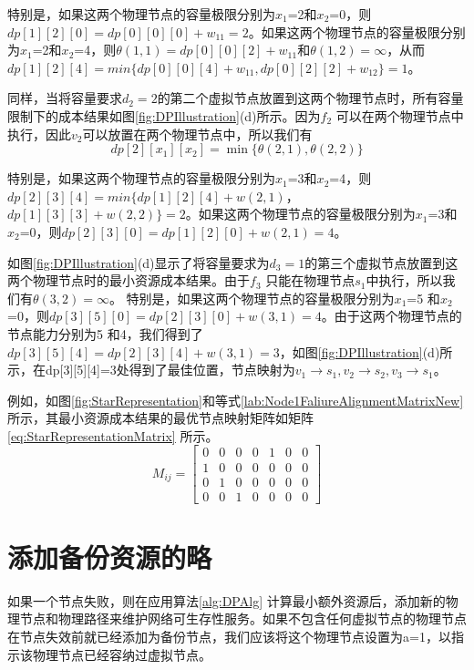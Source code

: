 特别是，如果这两个物理节点的容量极限分别为$x_1$=2和$x_2$=0，则$dp[1][2][0]= dp[0][0][0]+w_{11}=2$。如果这两个物理节点的容量极限分别为$x_1$=2和$x_2$=4，则$\theta (1,1)=dp[0][0][2]+w_{11}$和$\theta (1,2)=\infty$，从而$dp[1][2][4]=min\{ dp[0][0][4]+w_{11}, dp[0][2][2]+w_{12} \}=1$。

同样，当将容量要求$d_2=2$的第二个虚拟节点放置到这两个物理节点时，所有容量限制下的成本结果如图\ref{fig:DPIllustration}(d)所示。因为$f_2$ 可以在两个物理节点中执行，因此$v_2$可以放置在两个物理节点中，所以我们有
\begin{equation}
dp[2][{x_1}][{x_2}] = \min \{\theta (2,1),\theta (2,2)\}
\end{equation}


特别是，如果这两个物理节点的容量极限分别为$x_1$=3和$x_2$=4，则$dp[2][3][4]=min\{dp[1][2][4]+w(2,1)$，$dp[1][3][3]+w(2,2)\}=2$。如果这两个物理节点的容量极限分别为$x_1$=3和$x_2$=0，则$dp[2][3][0]=dp[1][2][0]+w(2,1)=4$。

如图\ref{fig:DPIllustration}(d)显示了将容量要求为$d_3=1$的第三个虚拟节点放置到这两个物理节点时的最小资源成本结果。由于$f_3$ 只能在物理节点$s_1$中执行，所以我们有$\theta (3,2)=\infty$。 特别是，如果这两个物理节点的容量极限分别为$x_1$=5 和$x_2$=0，则$dp[3][5][0]=dp[2][3][0]+w(3,1)=4$。由于这两个物理节点的节点能力分别为5 和4，我们得到了$dp[3][5][4]=dp[2][3][4]+w(3,1)=3$，如图\ref{fig:DPIllustration}(d)所示，在dp[3][5][4]=3处得到了最佳位置，节点映射为$v_1\rightarrow s_1, v_2\rightarrow s_2, v_3\rightarrow s_1$。

例如，如图\ref{fig:StarRepresentation}和等式\ref{lab:Node1FaliureAlignmentMatrixNew} 所示，其最小资源成本结果的最优节点映射矩阵如矩阵\ref{eq:StarRepresentationMatrix} 所示。
\begin{equation}
M_{ij}=\left[ {\begin{array}{*{20}{c}}
0&0&0&0&1&0&0\\
1&0&0&0&0&0&0\\
0&1&0&0&0&0&0\\
0&0&1&0&0&0&0
\end{array}} \right]
\label{eq:StarRepresentationMatrix}
\end{equation}
\section{添加备份资源的略}
如果一个节点失败，则在应用算法\ref{alg:DPAlg} 计算最小额外资源后，添加新的物理节点和物理路径来维护网络可生存性服务。如果不包含任何虚拟节点的物理节点在节点失效前就已经添加为备份节点，我们应该将这个物理节点设置为a=1，以指示该物理节点已经容纳过虚拟节点。


